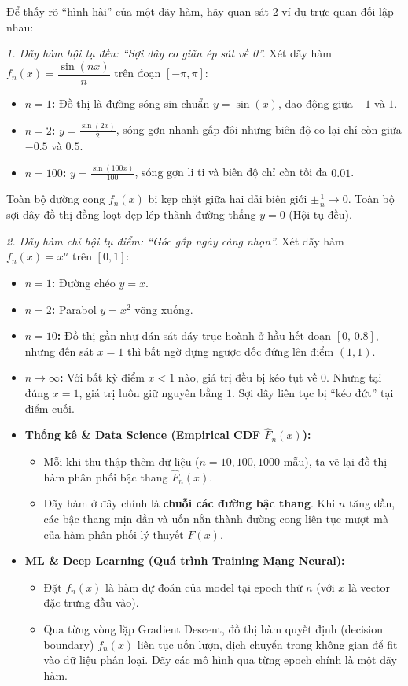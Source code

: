 Để thấy rõ ``hình hài'' của một dãy hàm, hãy quan sát 2 ví dụ trực quan đối lập nhau:

\textit{1. Dãy hàm hội tụ đều: ``Sợi dây co giãn ép sát về 0''.} Xét dãy hàm $f_n(x)=\dfrac{\sin(nx)}{n}$ trên đoạn $[-\pi,\pi]$:
\begin{itemize}
\item \textbf{$n=1$:} Đồ thị là đường sóng sin chuẩn $y=\sin(x)$, dao động giữa $-1$ và $1$.
\item \textbf{$n=2$:} $y=\frac{\sin(2x)}{2}$, sóng gợn nhanh gấp đôi nhưng biên độ co lại chỉ còn giữa $-0.5$ và $0.5$.
\item \textbf{$n=100$:} $y=\frac{\sin(100x)}{100}$, sóng gợn li ti và biên độ chỉ còn tối đa $0.01$.
\end{itemize}
Toàn bộ đường cong $f_n(x)$ bị kẹp chặt giữa hai dải biên giới $\pm\frac1n\to 0$. Toàn bộ sợi dây đồ thị đồng loạt dẹp lép thành đường thẳng $y=0$ (Hội tụ đều).

\textit{2. Dãy hàm chỉ hội tụ điểm: ``Góc gấp ngày càng nhọn''.} Xét dãy hàm $f_n(x)=x^{n}$ trên $[0,1]$:
\begin{itemize}
\item \textbf{$n=1$:} Đường chéo $y=x$.
\item \textbf{$n=2$:} Parabol $y=x^{2}$ võng xuống.
\item \textbf{$n=10$:} Đồ thị gần như dán sát đáy trục hoành ở hầu hết đoạn $[0,\,0.8]$, nhưng đến sát $x=1$ thì bất ngờ dựng ngược dốc đứng lên điểm $(1,1)$.
\item \textbf{$n\to\infty$:} Với bất kỳ điểm $x<1$ nào, giá trị đều bị kéo tụt về $0$. Nhưng tại đúng $x=1$, giá trị luôn giữ nguyên bằng $1$. Sợi dây liên tục bị ``kéo đứt'' tại điểm cuối.
\end{itemize}

\begin{itemize}
\item \textbf{Thống kê \& Data Science (Empirical CDF $\widehat F_n(x)$):}
  \begin{itemize}
  \item Mỗi khi thu thập thêm dữ liệu ($n=10,100,1000$ mẫu), ta vẽ lại đồ thị hàm phân phối bậc thang $\widehat F_n(x)$.
  \item Dãy hàm ở đây chính là \textbf{chuỗi các đường bậc thang}. Khi $n$ tăng dần, các bậc thang mịn dần và uốn nắn thành đường cong liên tục mượt mà của hàm phân phối lý thuyết $F(x)$.
  \end{itemize}
\item \textbf{ML \& Deep Learning (Quá trình Training Mạng Neural):}
  \begin{itemize}
  \item Đặt $f_n(x)$ là hàm dự đoán của model tại epoch thứ $n$ (với $x$ là vector đặc trưng đầu vào).
  \item Qua từng vòng lặp Gradient Descent, đồ thị hàm quyết định (decision boundary) $f_n(x)$ liên tục uốn lượn, dịch chuyển trong không gian để fit vào dữ liệu phân loại. Dãy các mô hình qua từng epoch chính là một dãy hàm.
  \end{itemize}
\end{itemize}


